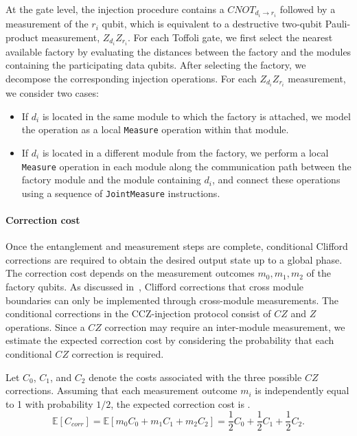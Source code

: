 \documentclass[sigconf]{acmart}
\begin{document}
At the gate level, the injection procedure contains a $CNOT_{d_i\rightarrow r_i}$ followed by a measurement of the $r_i$ qubit, which is equivalent to a destructive two-qubit Pauli-product measurement, $Z_{d_i}Z_{r_i}$. For each Toffoli gate, we first select the nearest available factory by evaluating the distances between the factory and the modules containing the participating data qubits. After selecting the factory, we decompose the corresponding injection operations. For each $Z_{d_i}Z_{r_i}$ measurement, we consider two cases:
\begin{itemize}
	\item If $d_i$ is located in the same module to which the factory is attached, we model the operation as a local \texttt{Measure} operation within that module.
	\item If $d_i$ is located in a different module from the factory, we perform a local \texttt{Measure} operation in each module along the communication path between the factory module and the module containing $d_i$, and connect these operations using a sequence of \texttt{JointMeasure} instructions.
\end{itemize}
%
\paragraph{Correction cost}
\label{subsub:corr_cost}
Once the entanglement and measurement steps are complete, conditional Clifford corrections are required to obtain the desired output state up to a global phase. The correction cost depends on the measurement outcomes $m_0, m_1, m_2$ of the factory qubits. As discussed in~\cite[Section~3.4]{tourdegross}, Clifford corrections that cross module boundaries can only be implemented through cross-module measurements. The conditional corrections in the CCZ-injection protocol consist of $CZ$ and $Z$ operations. Since a $CZ$ correction may require an inter-module measurement, we estimate the expected correction cost by considering the probability that each conditional $CZ$ correction is required.

Let $C_0$, $C_1$, and $C_2$ denote the costs associated with the three possible $CZ$ corrections. Assuming that each measurement outcome $m_i$ is independently equal to 1 with probability $1/2$, the expected correction cost is .
$$\mathbb{E}\!\left[C_{corr}\right] = \mathbb{E}\!\left[m_0 C_0 + m_1 C_1 + m_2 C_2\right] = \frac{1}{2}C_0 + \frac{1}{2}C_1 + \frac{1}{2}C_2.$$
\end{document}

